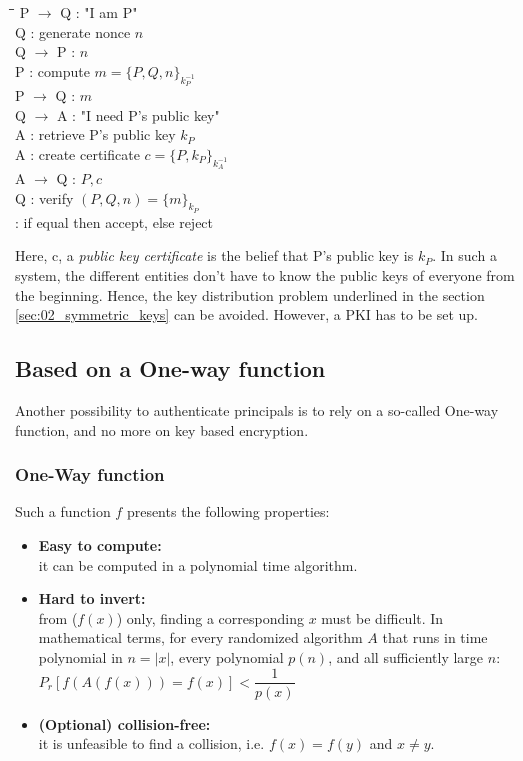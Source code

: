 \begin{tabbing}
	\hspace{4em}\=\hspace{4em}\=\hspace{2em}\=\kill
	\>  P $\rightarrow$ Q\>  : \> "I am P" \\
	\>  Q  \>  : \> generate nonce $n$	\\
	\>  Q $\rightarrow$ P \>  : \> $n$ \\
	\>  P  \>  : \> compute $m = \lbrace P, Q, n \rbrace_{k_{P}^{-1}}$ 				\\
	\>  P $\rightarrow$ Q \>  : \> $m$ \\
	\>  Q $\rightarrow$ A \>  : \> "I need P's public key" \\
	\>  A \>  : \> retrieve P's public key $k_{P}$ \\
	\>  A \>  : \> create certificate $c = \lbrace P, k_{P} \rbrace_{k_{A}^{-1}} $ \\
	\>  A $\rightarrow$ Q \>  : \> $P,c$ \\
	\>  Q \>  : \> verify $(P,Q,n) = \lbrace m \rbrace_{k_{P}}$ \\
	\>    \>  : \> if equal then accept, else reject \\
\end{tabbing} 

Here, c, a \emph{public key certificate} is the belief that P's public key is $k_{P}$. In such a system, the different entities don't have to know the public keys of everyone from the beginning. Hence, the key distribution problem underlined in the section \ref{sec:02_symmetric_keys} can be avoided. However, a PKI has to be set up.

\subsection{Based on a One-way function}
Another possibility to authenticate principals is to rely on a so-called One-way function, and no more on key based encryption.

\subsubsection{One-Way function}
Such a function $f$ presents the following properties:
\begin{itemize}
	\item \textbf{Easy to compute:} \\
	it can be computed in a polynomial time algorithm.
	\item \textbf{Hard to invert:} \\
	from ($f(x)$) only, finding a corresponding $x$ must be difficult. In mathematical terms,  for every randomized algorithm $A$ that runs in time polynomial in $n=|x|$, every polynomial $p(n)$, and all sufficiently large $n$: \\
	$ P_{r}[f(A(f(x))) = f(x)] < \dfrac{1}{p(x)}$ 
	\item \textbf{(Optional) collision-free:} \\
	it is unfeasible to find a collision, i.e. $f(x) = f(y)$ and $x \ne y$.
\end{itemize}


